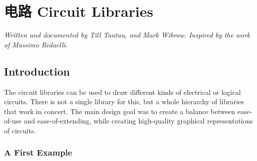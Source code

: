 %
%
%


\section{电路 Circuit Libraries}
\label{section-library-circuits}

\emph{Written and documented by Till Tantau, and Mark Wibrow. Inspired
by the work of Massimo Redaelli.}


\subsection{Introduction}

The circuit libraries can be used to draw different kinds of electrical or
logical circuits. There is not a single library for this, but a whole hierarchy
of libraries that work in concert. The main design goal was to create a balance
between ease-of-use and ease-of-extending, while creating high-quality
graphical representations of circuits.
%
\begin{codeexample}
\end{codeexample}


\subsubsection{A First Example}

